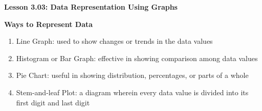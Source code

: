 \begin{center}
\textbf{Lesson 3.03: Data Representation Using Graphs}
\end{center}

\vspace*{-1.5ex}

\noindent\textbf{Ways to Represent Data}
\begin{enumerate}[noitemsep, label = \color{blue}\arabic*. ]
\item Line Graph: used to show changes or trends in the data values
\item Histogram or Bar Graph: effective in showing comparison among data values
\item Pie Chart: useful in showing distribution, percentages, or parts of a whole
\item Stem-and-leaf Plot: a diagram wherein every data value is divided into its first digit and last digit
\end{enumerate}
